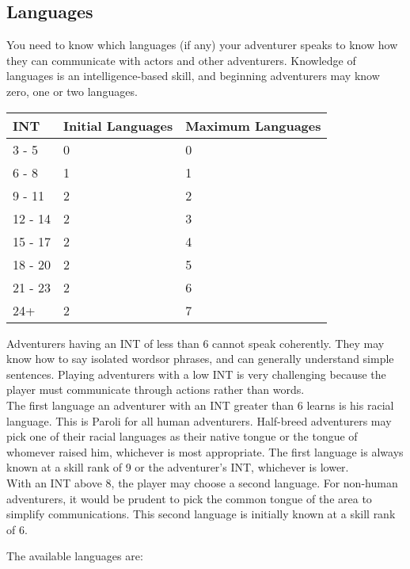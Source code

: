 \begin{multicols*}{2}
\section{Languages}
\label{create-language}
You need to know which languages (if any) your adventurer speaks to know how they can communicate with actors and other adventurers. Knowledge of languages is an intelligence-based skill, and beginning adventurers may know zero, one or two languages.
\begin{tcolorbox}[breakable,boxrule=0pt,title=\textbf{Learned Language}]
\begin{tabular}{l l l}
INT & Initial Languages & Maximum Languages\\
\midrule
3 - 5 & 0 & 0\\
6 - 8 & 1 & 1\\
9 - 11 & 2 & 2\\
12 - 14 & 2 & 3\\
15 - 17 & 2 & 4\\
18 - 20 & 2 & 5\\
21 - 23 & 2 & 6\\
24+ & 2 & 7\\
\end{tabular}
\end{tcolorbox}
Adventurers having an INT of less than 6 cannot speak coherently. They may know how to say isolated wordsor phrases, and can generally understand simple sentences. Playing adventurers with a low INT is very challenging because the player must communicate through actions rather than words. \\
The first language an adventurer with an INT greater than 6 learns is his racial language. This is Paroli for all human adventurers. Half-breed adventurers may pick one of their racial languages as their native tongue or the tongue of whomever raised him, whichever is most appropriate. The first language is always known at a skill rank of 9 or the adventurer's INT, whichever is lower.\\
With an INT above 8, the player may choose a second language. For non-human adventurers, it would be prudent to pick the common tongue of the area to simplify communications. This second language is initially known at a skill rank of 6.

The available languages are:


\end{multicols*}
